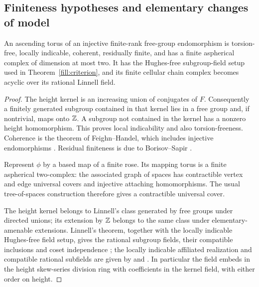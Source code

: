 \subsection{Finiteness hypotheses and elementary changes of model}

\begin{lemma}\label{asc:field-hypotheses}
An ascending torus of an injective finite-rank free-group endomorphism is
torsion-free, locally indicable, coherent, residually finite, and has a
finite aspherical complex of dimension at most two. It has the
Hughes-free subgroup-field setup used in Theorem~\ref{fill:criterion}, and
its finite cellular chain complex becomes acyclic over its rational
Linnell field.
\end{lemma}

\begin{proof}
The height kernel is an increasing union of conjugates of $F$.
Consequently a finitely generated subgroup contained in that kernel lies
in a free group and, if nontrivial, maps onto $\mathbb Z$. A subgroup not contained
in the kernel has a nonzero height homomorphism. This proves local
indicability and also torsion-freeness. Coherence is the theorem of
Feighn--Handel, which includes injective endomorphisms
\cite[Theorem~1.1]{FeighnHandel1999}. Residual finiteness is due to Borisov--Sapir
\cite{BorisovSapir2005}.

Represent $\phi$ by a based map of a finite rose. Its mapping torus is a
finite aspherical two-complex: the associated graph of spaces has
contractible vertex and edge universal covers and injective attaching
homomorphisms. The usual tree-of-spaces construction therefore gives a
contractible universal cover.

The height kernel belongs to Linnell's class generated by free groups
under directed unions; its extension by $\mathbb Z$ belongs to the same class
under elementary-amenable extensions. Linnell's theorem, together with
the locally indicable Hughes-free field setup, gives the rational
subgroup fields, their compatible inclusions and coset independence
\cite{Linnell1993,Hughes1970}; the locally indicable affiliated realization
and compatible rational subfields are given by
\cite[Corollaries~6.2--6.3]{JaikinLopezAlvarez2020} and
\cite[Section~2.3 and Proposition~2.2]{JaikinUniversality2021}.
In particular the field embeds in the
height skew-series division ring with coefficients in the kernel field,
with either order on height.


\end{proof}
